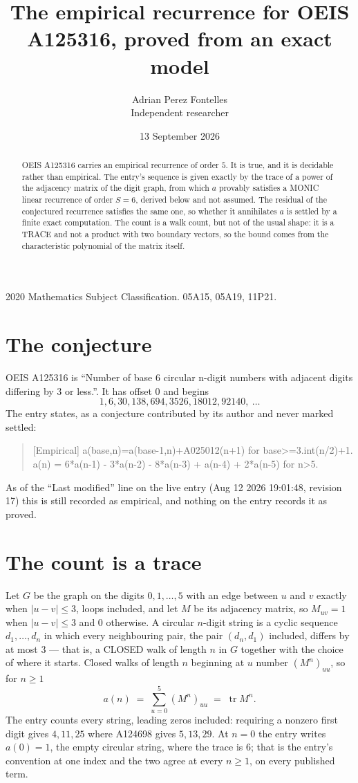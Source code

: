 \documentclass[11pt,a4paper]{article}
\title{The empirical recurrence for OEIS A125316, proved from an exact model}
\author{Adrian Perez Fontelles\\ \small Independent researcher}
\date{13 September 2026}
\theoremstyle{plain}
\theoremstyle{definition}
\begin{document}
\maketitle

\begin{abstract}
OEIS A125316 carries an empirical recurrence of order $5$. It is true, and it is
decidable rather than empirical. The entry's sequence is given exactly by the trace of a power of the adjacency matrix of the digit graph, from
which $a$ provably satisfies a MONIC linear recurrence of order $S=6$, derived below and not
assumed. The residual of the conjectured recurrence satisfies the same one, so whether it
annihilates $a$ is settled by a finite exact computation. The count is a walk count, but not of the usual shape: it is a TRACE and not a product with two boundary vectors, so the bound comes from the characteristic polynomial of the matrix itself.
\end{abstract}

\noindent\small 2020 Mathematics Subject Classification. 05A15, 05A19, 11P21.\normalsize

\section{The conjecture}

OEIS A125316 is ``Number of base 6 circular n-digit numbers with adjacent digits differing by 3 or less.''. It has offset $0$ and begins
\[
1, 6, 30, 138, 694, 3526, 18012, 92140,\ \dots
\]
The entry states, as a conjecture contributed by its author and never marked settled:
\begin{quote}
[Empirical] a(base,n)=a(base-1,n)+A025012(n+1) for base>=3.int(n/2)+1. a(n) = 6*a(n-1) - 3*a(n-2) - 8*a(n-3) + a(n-4) + 2*a(n-5) for n>5.
\end{quote}
As of the ``Last modified'' line on the live entry (Aug 12 2026 19:01:48, revision 17)
this is still recorded as empirical, and nothing on the entry records it as proved.

\section{The count is a trace}

Let $G$ be the graph on the digits $0,1,\dots,5$ with an edge between $u$ and $v$ exactly
when $|u-v|\le3$, loops included, and let $M$ be its adjacency matrix, so $M_{uv}=1$ when
$|u-v|\le3$ and $0$ otherwise. A circular $n$-digit string is a cyclic sequence
$d_1,\dots,d_n$ in which every neighbouring pair, the pair $(d_n,d_1)$ included, differs by at
most $3$ --- that is, a CLOSED walk of length $n$ in $G$ together with the choice of where it
starts. Closed walks of length $n$ beginning at $u$ number $(M^n)_{uu}$, so for $n\ge1$
\[
a(n)\;=\;\sum_{u=0}^{5}(M^{n})_{uu}\;=\;\operatorname{tr}M^{n} .
\]
The entry counts every string, leading zeros included: requiring a nonzero first digit gives
$4,11,25$ where A124698 gives $5,13,29$. At $n=0$ the entry writes $a(0)=1$, the empty circular
string, where the trace is $6$; that is the entry's convention at one index and the two agree
at every $n\ge1$, on every published term.
\end{document}
